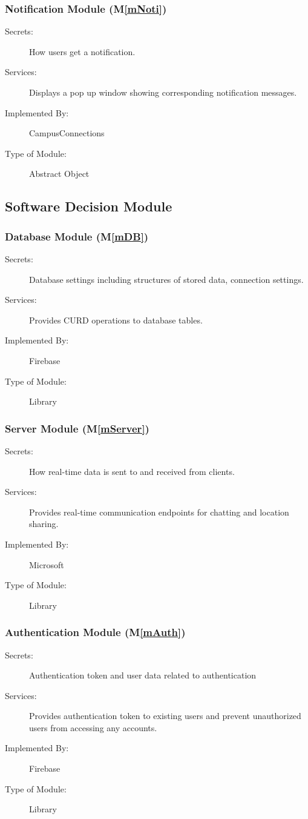 \documentclass[12pt, titlepage]{article}
\newcommand{\mref}[1]{M\ref{#1}}
\begin{document}
\subsubsection{Notification Module (\mref{mNoti})}
\begin{description}
\item[Secrets:] How users get a notification.
\item[Services:]Displays a pop up window showing corresponding notification messages.
\item[Implemented By:] CampusConnections
\item[Type of Module:] Abstract Object
\end{description}

\subsection{Software Decision Module}
\subsubsection{Database Module (\mref{mDB})}
\begin{description}
\item[Secrets:]Database settings including structures of stored data, connection settings.
\item[Services:]Provides CURD operations to database tables.
\item[Implemented By:] Firebase
\item[Type of Module:] Library
\end{description}

\subsubsection{Server Module (\mref{mServer})}
\begin{description}
\item[Secrets:]How real-time data is sent to and received from clients.
\item[Services:]Provides real-time communication endpoints for chatting and location sharing.
\item[Implemented By:] Microsoft
\item[Type of Module:] Library
\end{description}

\subsubsection{Authentication Module (\mref{mAuth})}
\begin{description}
\item[Secrets:]Authentication token and user data related to authentication
\item[Services:]Provides authentication token to existing users and prevent unauthorized users from accessing any accounts.
\item[Implemented By:] Firebase
\item[Type of Module:] Library
\end{description}
\end{document}
